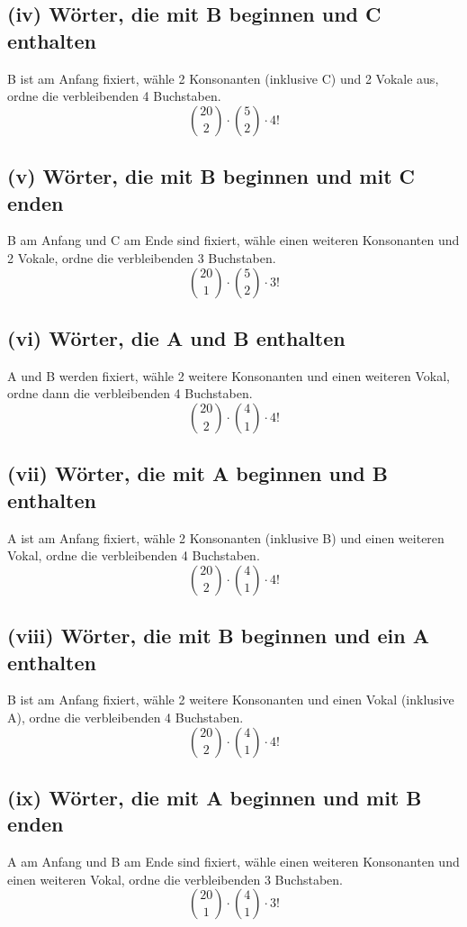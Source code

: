 \documentclass{article}
\begin{document}
\subsection*{(iv) Wörter, die mit B beginnen und C enthalten}
B ist am Anfang fixiert, wähle 2 Konsonanten (inklusive C) und 2 Vokale aus, ordne die verbleibenden 4 Buchstaben.
\[
	\binom{20}{2} \cdot \binom{5}{2} \cdot 4!
\]

\subsection*{(v) Wörter, die mit B beginnen und mit C enden}
B am Anfang und C am Ende sind fixiert, wähle einen weiteren Konsonanten und 2 Vokale, ordne die verbleibenden 3 Buchstaben.
\[
	\binom{20}{1} \cdot \binom{5}{2} \cdot 3!
\]

\subsection*{(vi) Wörter, die A und B enthalten}
A und B werden fixiert, wähle 2 weitere Konsonanten und einen weiteren Vokal, ordne dann die verbleibenden 4 Buchstaben.
\[
	\binom{20}{2} \cdot \binom{4}{1} \cdot 4!
\]

\subsection*{(vii) Wörter, die mit A beginnen und B enthalten}
A ist am Anfang fixiert, wähle 2 Konsonanten (inklusive B) und einen weiteren Vokal, ordne die verbleibenden 4 Buchstaben.
\[
	\binom{20}{2} \cdot \binom{4}{1} \cdot 4!
\]

\subsection*{(viii) Wörter, die mit B beginnen und ein A enthalten}
B ist am Anfang fixiert, wähle 2 weitere Konsonanten und einen Vokal (inklusive A), ordne die verbleibenden 4 Buchstaben.
\[
	\binom{20}{2} \cdot \binom{4}{1} \cdot 4!
\]

\subsection*{(ix) Wörter, die mit A beginnen und mit B enden}
A am Anfang und B am Ende sind fixiert, wähle einen weiteren Konsonanten und einen weiteren Vokal, ordne die verbleibenden 3 Buchstaben.
\[
	\binom{20}{1} \cdot \binom{4}{1} \cdot 3!
\]
\end{document}
